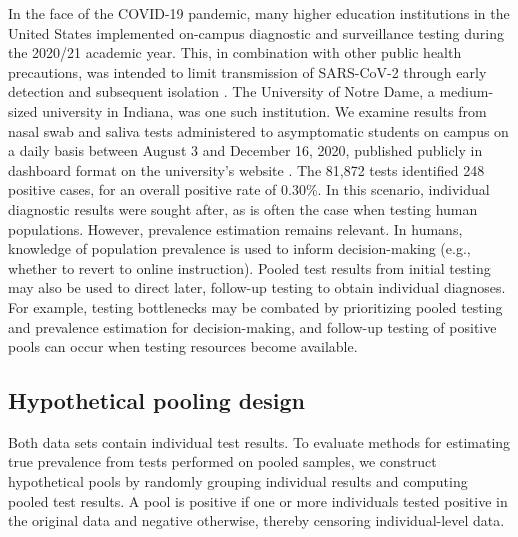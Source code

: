 \documentclass{article}
\begin{document}
In the face of the COVID-19 pandemic, many higher education institutions in the United States implemented on-campus diagnostic and surveillance testing during the 2020/21 academic year. This, in combination with other public health precautions, was intended to limit transmission of SARS-CoV-2 through early detection and subsequent isolation \cite{fox2021response}. The University of Notre Dame, a medium-sized university in Indiana, was one such institution. We examine results from nasal swab and saliva tests administered to asymptomatic students on campus on a daily basis between August 3 and December 16, 2020, published publicly in dashboard format on the university's website \cite{ndcovid}. The 81,872 tests identified 248 positive cases, for an overall positive rate of 0.30\%. In this scenario, individual diagnostic results were sought after, as is often the case when testing human populations. However, prevalence estimation remains relevant. In humans, knowledge of population prevalence is used to inform decision-making (e.g., whether to revert to online instruction). Pooled test results from initial testing may also be used to direct later, follow-up testing to obtain individual diagnoses. For example, testing bottlenecks may be combated by prioritizing pooled testing and prevalence estimation for decision-making, and follow-up testing of positive pools can occur when testing resources become available. 

\subsection{Hypothetical pooling design}

Both data sets contain individual test results. To evaluate methods for estimating true prevalence from tests performed on pooled samples, we construct hypothetical pools by randomly grouping individual results and computing pooled test results. A pool is positive if one or more individuals tested positive in the original data and negative otherwise, thereby censoring individual-level data.
\end{document}
